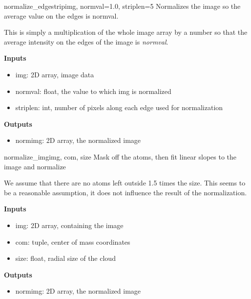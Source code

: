\documentclass[letterpaper,10pt,english]{manual}
\begin{document}
\hypertarget{imageprocess.normalize_edgestrip}{}\begin{funcdesc}{normalize\_edgestrip}{img, normval=1.0, striplen=5}
Normalizes the image so the average value on the edges is normval.

This is simply a multiplication of the whole image array by a number
so that the average intensity on the edges of the image is \emph{normval}.

\textbf{Inputs}
\begin{itemize}
\item {} 
img: 2D array, image data

\item {} 
normval: float, the value to which img is normalized

\item {} 
striplen: int, number of pixels along each edge used for normalization

\end{itemize}

\textbf{Outputs}
\begin{itemize}
\item {} 
normimg: 2D array, the normalized image

\end{itemize}
\end{funcdesc}

\hypertarget{imageprocess.normalize_img}{}\begin{funcdesc}{normalize\_img}{img, com, size}
Mask off the atoms, then fit linear slopes to the image and normalize

We assume that there are no atoms left outside 1.5 times the size. This
seems to be a reasonable assumption, it does not influence the result of
the normalization.

\textbf{Inputs}
\begin{itemize}
\item {} 
img: 2D array, containing the image

\item {} 
com: tuple, center of mass coordinates

\item {} 
size: float, radial size of the cloud

\end{itemize}

\textbf{Outputs}
\begin{itemize}
\item {} 
normimg: 2D array, the normalized image

\end{itemize}
\end{funcdesc}
\end{document}

